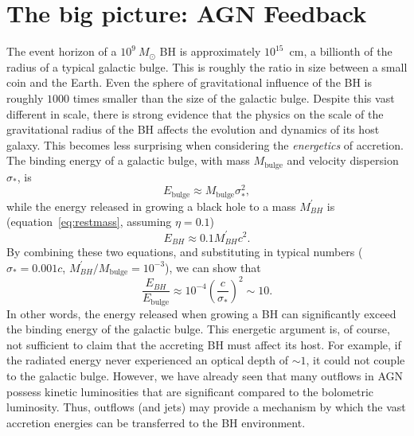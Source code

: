 \section{The big picture: AGN Feedback}
\label{sec:agn_feedback}
The event horizon of a $10^9~M_\odot$ BH is approximately 
$10^{15}$~cm, a billionth of the radius of a typical galactic bulge. This is 
roughly the ratio in size between a small coin and the 
Earth. Even the sphere of gravitational influence of the BH is roughly 
$1000$ times smaller than the size of the galactic bulge.
Despite this vast different in scale, there is strong evidence
that the physics on the scale of the gravitational
radius of the BH affects the evolution and dynamics of its host galaxy.
This becomes less surprising when considering the {\em energetics} of accretion.
The binding energy of a galactic bulge, with mass 
$M_{\mathrm{bulge}}$ and velocity dispersion $\sigma_*$, is 
\begin{equation}
E_{\mathrm{bulge}} \approx M_{\mathrm{bulge}} \sigma_*^2,
\end{equation} 
while the energy released in growing a black hole to a 
mass $M_{BH}^\prime$ is (equation~\ref{eq:restmass}, assuming $\eta=0.1$)
\begin{equation}
E_{BH} \approx 0.1 M_{BH}^\prime c^2.  
\end{equation}
By combining these two equations, and substituting in typical numbers 
($\sigma_* = 0.001c$, $M_{BH}^\prime / M_{\mathrm{bulge}} = 10^{-3}$), we can show that 
\begin{equation}
\frac{E_{BH}}{E_{\mathrm{bulge}}} \approx 10^{-4} \left( \frac{c}{\sigma_*} \right)^2 \sim 10.
\end{equation}
In other words, the energy released when growing a BH can significantly exceed
the binding energy of the galactic bulge. This energetic 
argument is, of course, not sufficient to claim that the accreting BH must affect its
host. For example, if the radiated energy never experienced an 
optical depth of $\sim 1$, it could not couple to the galactic bulge. However,
we have already seen that many outflows in AGN possess kinetic luminosities that
are significant compared to the bolometric luminosity. Thus, outflows 
(and jets) may provide a mechanism by which the vast accretion energies can
be transferred to the BH environment.

